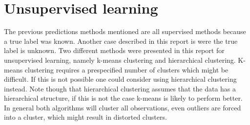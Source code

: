 \section{Unsupervised learning}
The previous predictions methods mentioned are all supervised methods because a true label was known. Another case described in this report is were the true label is unknown. Two different methods were presented in this report for unsupervised learning, namely k-means clustering and hierarchical clustering. K-means clustering requires a prespecified  number of clusters which might be difficult. If this is not possible one could consider using hierarchical clustering instead. Note though that hierarchical clustering assumes that the data has a hierarchical structure, if this is not the case k-means is likely to perform better. In general both algorithms will cluster all observations, even outliers are forced into a cluster, which might result in distorted clusters.